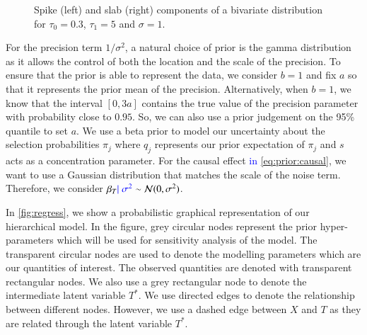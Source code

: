 \documentclass[preprint,12pt]{elsarticle}
\newcommand{\normal}{\mathcal{N}}
\newcommand{\added}[1]{\textcolor{blue}{#1}}
\begin{document}
\begin{figure}
	\begin{center}
\qquad
{}
	\end{center}
	\caption{Spike (left) and slab (right) components of a bivariate distribution for $\tau_0 = 0.3$, $\tau_1 = 5$ and $\sigma=1$.}
	\label{fig:ssbl}
\end{figure}

For the precision term $1/\sigma^2$, a natural choice of prior is the gamma distribution
as it allows the control of both the location and the scale of the precision.
To ensure that the prior is able to represent the data, we consider $b=1$ and 
fix $a$ so that it represents the prior mean of the precision.
Alternatively, when $b=1$, we know that the interval
$[0, 3a]$ contains the true value of the precision parameter with probability close to $0.95$.
So, we can also use a prior judgement on the 95\% quantile to set $a$.
We use a beta prior to
model our uncertainty about
the selection probabilities $\pi_j$ where  $q_j$ represents our prior expectation of $\pi_j$ and $s$ acts as 
a concentration parameter.
For the causal effect \added{in \cref{eq:prior:causal}}, we want to use a Gaussian distribution that 
matches the scale of the noise term. Therefore, we consider $\beta_T\added{\mid\sigma^2}\sim \normal(0,\sigma^2)$. 

In \cref{fig:regress}, we show a probabilistic graphical representation
of our hierarchical model. In the figure, grey circular nodes represent the
prior hyper-parameters which will be used for sensitivity analysis
of the model. The transparent circular nodes are used to denote
the modelling parameters which are our quantities of interest. 
The observed quantities are denoted with transparent rectangular
nodes. We also use a grey rectangular node to denote the intermediate
latent variable $T^*$. We use directed edges to denote the
relationship between different nodes. However, we use a dashed
edge between $X$ and $T$ as they are related through the latent
variable $T^*$. 
\end{document}
